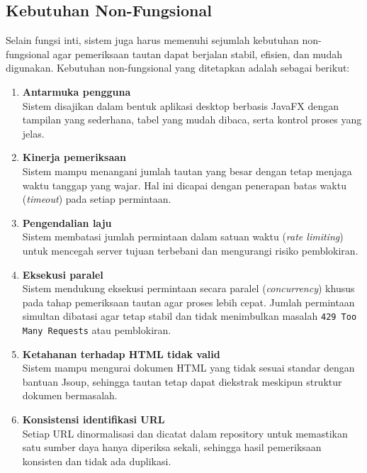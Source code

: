 \subsection{Kebutuhan Non-Fungsional}
\label{subsec:0303-kebutuhan-non-fungsional}

Selain fungsi inti, sistem juga harus memenuhi sejumlah kebutuhan non-fungsional agar pemeriksaan tautan dapat berjalan stabil, efisien, dan mudah digunakan. Kebutuhan non-fungsional yang ditetapkan adalah sebagai berikut:

\begin{enumerate}
    \item \textbf{Antarmuka pengguna}\\
    Sistem disajikan dalam bentuk aplikasi desktop berbasis JavaFX dengan tampilan yang sederhana, tabel yang mudah dibaca, serta kontrol proses yang jelas.

    \item \textbf{Kinerja pemeriksaan}\\
    Sistem mampu menangani jumlah tautan yang besar dengan tetap menjaga waktu tanggap yang wajar. Hal ini dicapai dengan penerapan batas waktu (\textit{timeout}) pada setiap permintaan.

    \item \textbf{Pengendalian laju}\\
    Sistem membatasi jumlah permintaan dalam satuan waktu (\textit{rate limiting}) untuk mencegah server tujuan terbebani dan mengurangi risiko pemblokiran.

    \item \textbf{Eksekusi paralel}\\
    Sistem mendukung eksekusi permintaan secara paralel (\textit{concurrency}) khusus pada tahap pemeriksaan tautan agar proses lebih cepat. Jumlah permintaan simultan dibatasi agar tetap stabil dan tidak menimbulkan masalah \texttt{429 Too Many Requests} atau pemblokiran.

    \item \textbf{Ketahanan terhadap HTML tidak valid}\\
    Sistem mampu mengurai dokumen HTML yang tidak sesuai standar dengan bantuan Jsoup, sehingga tautan tetap dapat diekstrak meskipun struktur dokumen bermasalah.

    \item \textbf{Konsistensi identifikasi URL}\\
    Setiap URL dinormalisasi dan dicatat dalam repository untuk memastikan satu sumber daya hanya diperiksa sekali, sehingga hasil pemeriksaan konsisten dan tidak ada duplikasi.


\end{enumerate}
